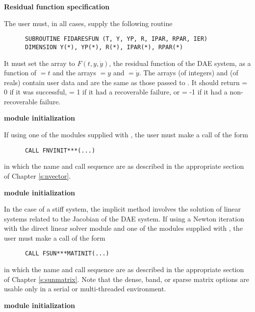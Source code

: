 %
\begin{Steps}
  
\item {\bf Residual function specification}
  
  The user must, in all cases, supply the following {\F} routine
\begin{verbatim}
      SUBROUTINE FIDARESFUN (T, Y, YP, R, IPAR, RPAR, IER)
      DIMENSION Y(*), YP(*), R(*), IPAR(*), RPAR(*)
\end{verbatim}
  It must set the  array to $F(t,y,\dot{y})$, the residual function of the DAE
  system, as a function of  $ = t$ and the arrays  $ = y$ and
   $ = \dot{y}$.  
  The arrays  (of integers) and  (of reals) contain user data
  and are the same as those passed to .
  It should return  = 0 if it was successful,
   = 1 if it had a recoverable failure, or
   = -1 if it had a non-recoverable failure.
  
\item  {\bf {\nvector} module initialization}

  If using one of the {\nvector} modules supplied with {\sundials},
  the user must make a call of the form
\begin{verbatim}
      CALL FNVINIT***(...)
\end{verbatim}
in which the name and call sequence are as described in the appropriate
section of Chapter \ref{s:nvector}.


\item\label{i:fida_matrix_init} {\bf {\sunmatrix} module initialization}

  In the case of a stiff system, the implicit  method involves the solution
  of linear systems related to the Jacobian
  of the DAE system.  If using a Newton iteration with the direct {\sunlinsol} linear solver
  module and one of the {\sunmatrix} modules supplied with {\sundials}, 
  the user must make a call of the form
\begin{verbatim}
      CALL FSUN***MATINIT(...)
\end{verbatim}
in which the name and call sequence are as described in the appropriate
section of Chapter \ref{s:sunmatrix}.  Note that the dense, band, or
sparse matrix options are usable only in a serial or multi-threaded
environment. 


\item\label{i:fida_linsol_init} {\bf {\sunlinsol} module initialization}


\end{Steps}
